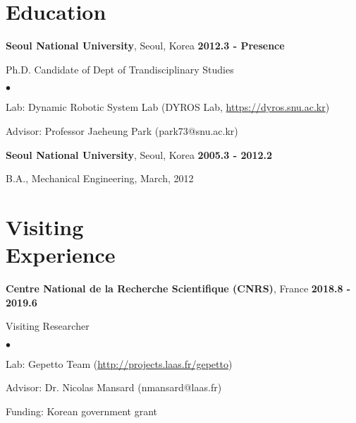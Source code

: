 \documentclass[margin,line]{res}
\newenvironment{list1}{
  \begin{list}{\ding{113}}{%
      \setlength{\itemsep}{0in}
      \setlength{\parsep}{0in} \setlength{\parskip}{0in}
      \setlength{\topsep}{0in} \setlength{\partopsep}{0in} 
      \setlength{\leftmargin}{0.17in}}}{\end{list}}
\newenvironment{list2}{
  \begin{list}{$\bullet$}{%
      \setlength{\itemsep}{0in}
      \setlength{\parsep}{0in} \setlength{\parskip}{0in}
      \setlength{\topsep}{0in} \setlength{\partopsep}{0in} 
      \setlength{\leftmargin}{0.2in}}}{\end{list}}
\begin{document}
\begin{resume}
\section{\sc Education}

{\bf Seoul National University}, Seoul, Korea  \hfill {\bf 2012.3 - Presence} \\
\vspace*{-.1in}
\begin{list1}
\vspace*{-.05in}
\item[] Ph.D. Candidate of Dept of Trandisciplinary Studies 
\begin{list2}
\item Lab: Dynamic Robotic System Lab (DYROS Lab, \url{https://dyros.snu.ac.kr})
\item Advisor: Professor Jaeheung Park (park73@snu.ac.kr)
\end{list2}
\end{list1}

{\bf Seoul National University}, Seoul, Korea  \hfill {\bf 2005.3 - 2012.2} \\
\vspace*{-.1in}
\begin{list1}
\vspace*{-.05in}
\item[] B.A., Mechanical Engineering,  March, 2012
\end{list1}

\section{\sc Visiting \\ Experience}
{\bf Centre National de la Recherche Scientifique (CNRS)}, France  \hfill {\bf 2018.8 - 2019.6} \\
\vspace*{-.1in}
\begin{list1}
\vspace*{-.05in}
\item[] Visiting Researcher
\begin{list2}
\item Lab: Gepetto Team (\url{http://projects.laas.fr/gepetto})
\item Advisor: Dr. Nicolas Mansard (nmansard@laas.fr)
\item Funding: Korean government grant
\end{list2}
\end{list1}


\end{resume}
\end{document}
